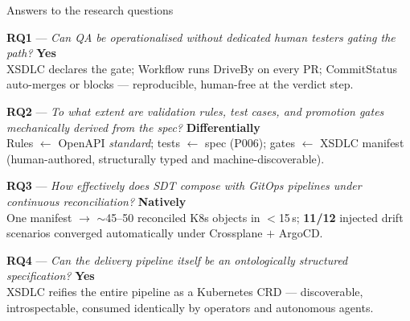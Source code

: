 \documentclass[11pt,aspectratio=169]{beamer}
\begin{document}
\begin{frame}{Answers to the research questions}

\footnotesize\vspace{-0.4em}

\textbf{RQ1} --- \emph{\scriptsize Can QA be operationalised without dedicated human testers gating the path?} \quad \alert{\textbf{Yes}}\\
\scriptsize XSDLC declares the gate; Workflow runs DriveBy on every PR; CommitStatus auto-merges
or blocks --- reproducible, human-free at the verdict step.

\vspace{0.3em}
\footnotesize\textbf{RQ2} --- \emph{\scriptsize To what extent are validation rules, test cases, and promotion gates mechanically derived from the spec?} \quad \alert{\textbf{Differentially}}\\
\scriptsize Rules $\leftarrow$ OpenAPI \emph{standard}; tests $\leftarrow$ spec (P006);
gates $\leftarrow$ XSDLC manifest (human-authored, structurally typed and machine-discoverable).

\vspace{0.3em}
\footnotesize\textbf{RQ3} --- \emph{\scriptsize How effectively does SDT compose with GitOps pipelines under continuous reconciliation?} \quad \alert{\textbf{Natively}}\\
\scriptsize One manifest $\to$ $\sim$45--50 reconciled K8s objects in $<$15\,s;
\textbf{11/12} injected drift scenarios converged automatically under Crossplane $+$ ArgoCD.

\vspace{0.3em}
\footnotesize\textbf{RQ4} --- \emph{\scriptsize Can the delivery pipeline itself be an ontologically structured specification?} \quad \alert{\textbf{Yes}}\\
\scriptsize XSDLC reifies the entire pipeline as a Kubernetes CRD --- discoverable,
introspectable, consumed identically by operators and autonomous agents.

\end{frame}
\end{document}
